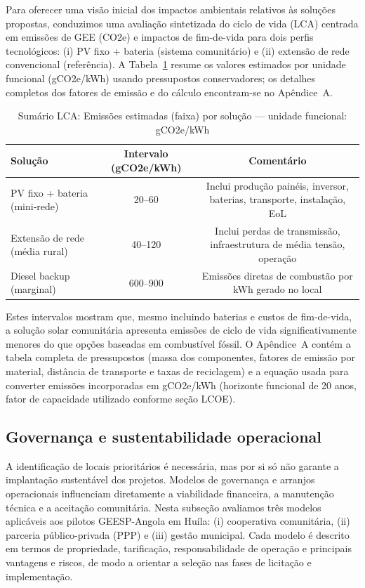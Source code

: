 \documentclass[12pt, a4paper]{article}
\begin{document}
{{{{{{{{{{{{Para oferecer uma visão inicial dos impactos ambientais relativos às soluções propostas, conduzimos
uma avaliação sintetizada do ciclo de vida (LCA) centrada em emissões de GEE (CO2e) e
impactos de fim-de-vida para dois perfis tecnológicos: (i) PV fixo + bateria (sistema comunitário)
e (ii) extensão de rede convencional (referência). A Tabela~\ref{tab:lca_summary} resume os
valores estimados por unidade funcional (gCO2e/kWh) usando pressupostos conservadores; os
detalhes completos dos fatores de emissão e do cálculo encontram-se no Apêndice~A.

\begin{table}[ht]
\centering
\caption{Sumário LCA: Emissões estimadas (faixa) por solução — unidade funcional: gCO2e/kWh}
\label{tab:lca_summary}
\begin{tabular}{lcc}
\toprule
\textbf{Solução} & \textbf{Intervalo (gCO2e/kWh)} & \textbf{Comentário} \\
\midrule
PV fixo + bateria (mini‑rede) & 20--60 & Inclui produção painéis, inversor, baterias, transporte, instalação, EoL \\
Extensão de rede (média rural) & 40--120 & Inclui perdas de transmissão, infraestrutura de média tensão, operação \\
Diesel backup (marginal) & 600--900 & Emissões diretas de combustão por kWh gerado no local \\
\bottomrule
\end{tabular}
\end{table}

Estes intervalos mostram que, mesmo incluindo baterias e custos de fim-de-vida, a solução
solar comunitária apresenta emissões de ciclo de vida significativamente menores do que
opções baseadas em combustível fóssil. O Apêndice~A contém a tabela completa de pressupostos
(massa dos componentes, fatores de emissão por material, distância de transporte e taxas de
reciclagem) e a equação usada para converter emissões incorporadas em gCO2e/kWh (horizonte
funcional de 20 anos, fator de capacidade utilizado conforme seção LCOE).


\subsection{Governança e sustentabilidade operacional}

A identificação de locais prioritários é necessária, mas por si só não garante a
implantação sustentável dos projetos. Modelos de governança e arranjos operacionais
influenciam diretamente a viabilidade financeira, a manutenção técnica e a aceitação
comunitária. Nesta subseção avaliamos três modelos aplicáveis aos pilotos GEESP-Angola
em Huíla: (i) cooperativa comunitária, (ii) parceria público-privada (PPP) e (iii)
gestão municipal. Cada modelo é descrito em termos de propriedade, tarificação,
responsabilidade de operação e principais vantagens e riscos, de modo a orientar a
seleção nas fases de licitação e implementação.

}}}}}}}}}}}}
\end{document}
